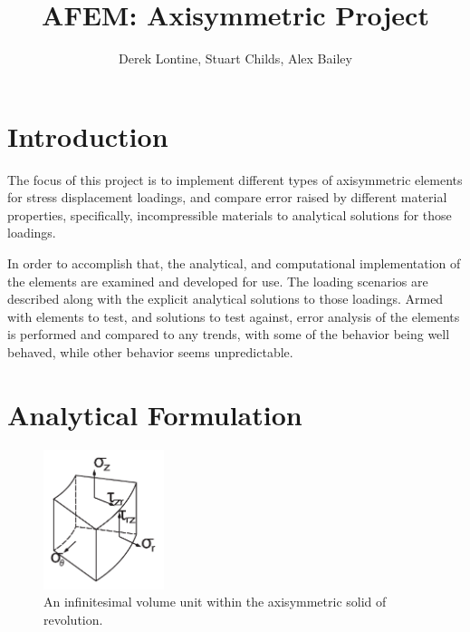 \documentclass[10pt,letterpaper]{report}
\author{Derek Lontine, Stuart Childs, Alex Bailey}
\title{AFEM: Axisymmetric Project}
\numberwithin{equation}{chapter}
\begin{document}
\maketitle
\chapter{Introduction}
\label{ch:Intro}

The focus of this project is to implement different types of axisymmetric elements for stress displacement loadings, and compare error raised by different material properties, specifically, incompressible materials to analytical solutions for those loadings.

In order to accomplish that, the analytical, and computational implementation of the elements are examined and developed for use.  The loading scenarios are described along with the explicit analytical solutions to those loadings.  Armed with elements to test, and solutions to test against, error analysis of the elements is performed and compared to any trends, with some of the behavior being well behaved, while other behavior seems unpredictable.

\chapter{Analytical Formulation}
\label{ch:Analytic}


\begin{figure}[H]
\centering
\includegraphics[width=100pt]{UNIT.pdf}
\caption[Axisymmetric Unit]{An infinitesimal volume unit within the axisymmetric solid of revolution.}
\label{fig:unit}
\end{figure}
\end{document}
